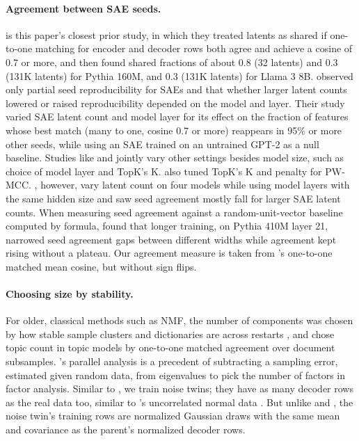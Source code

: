 \paragraph{Agreement between SAE seeds.}
\citet{paulo2025sae} is this paper's closest prior study, in which they treated latents as shared if one-to-one matching for encoder and decoder rows both agree and achieve a cosine of 0.7 or more, and then found shared fractions of about 0.8 (32 latents) and 0.3 (131K latents) for Pythia 160M, and 0.3 (131K latents) for Llama 3 8B. \citet{gerasimov2026unstable} observed only partial seed reproducibility for SAEs and that whether larger latent counts lowered or raised reproducibility depended on the model and layer. Their study varied SAE latent count and model layer for its effect on the fraction of features whose best match (many to one, cosine 0.7 or more) reappears in 95\% or more other seeds, while using an SAE trained on an untrained GPT-2 as a null baseline. Studies like \citet{song2026consistency} and \citet{cho2025faithfulsae} jointly vary other settings besides model size, such as choice of model layer and TopK's K. \citet{song2026consistency} also tuned TopK's K and penalty for PW-MCC. \citet{choi2026beyond}, however, vary latent count on four models while using model layers with the same hidden size and saw seed agreement mostly fall for larger SAE latent counts. When measuring seed agreement against a random-unit-vector baseline computed by formula, \citet{liu2026timescale} found that longer training, on Pythia 410M layer 21, narrowed seed agreement gaps between different widths while agreement kept rising without a plateau. Our agreement measure is taken from \citeauthor{fel2025archetypal}'s \citeyearpar{fel2025archetypal} one-to-one matched mean cosine, but without sign flips.

\paragraph{Choosing size by stability.}
For older, classical methods such as NMF, the number of components was chosen by how stable sample clusters and dictionaries are across restarts \citep{brunet2004metagenes,wu2016stanmf}, and \citet{greene2014howmany} chose topic count in topic models by one-to-one matched agreement over document subsamples. \citeauthor{horn1965rationale}'s \citeyearpar{horn1965rationale} parallel analysis is a precedent of subtracting a sampling error, estimated given random data, from eigenvalues to pick the number of factors in factor analysis. Similar to \citet{gerasimov2026unstable}, we train noise twins; they have as many decoder rows as the real data too, similar to \citeauthor{horn1965rationale}'s uncorrelated normal data \citep{dinno2009exploring}. But unlike \citet{gerasimov2026unstable} and \citet{liu2026timescale}, the noise twin's training rows are normalized Gaussian draws with the same mean and covariance as the parent's normalized decoder rows.
